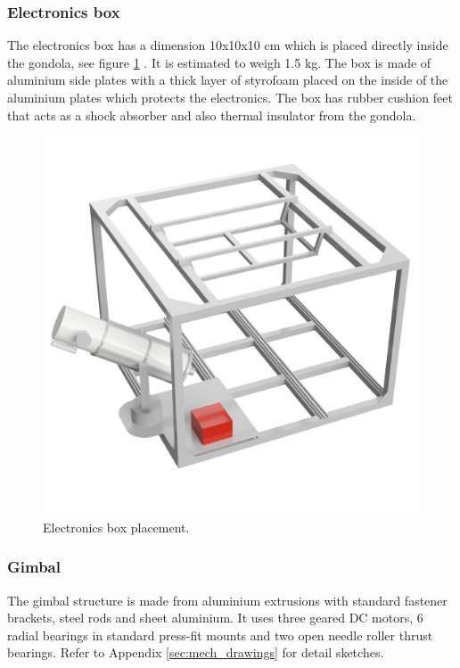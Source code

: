 \subsubsection{Electronics box}
\label{sec:4.4.2}


The electronics box has a dimension 10x10x10 cm which is placed directly inside the gondola, see figure \ref{fig::mechanical::ebox} . It is estimated to weigh 1.5 kg. The box is made of aluminium side plates with a thick layer of styrofoam placed on the inside of the aluminium plates which protects the electronics. The box has rubber cushion feet that acts as a shock absorber and also thermal insulator from the gondola.

\begin{figure}[H]
	\centering 
	\includegraphics[scale=0.4]{4-experiment-design/img/mechanical/ebox.png}
	\caption{Electronics box placement.}
	\label{fig::mechanical::ebox}
\end{figure}


\subsubsection{Gimbal}
\label {sec:4.4.3}

The gimbal structure is made from aluminium extrusions with standard fastener brackets, steel rods and sheet aluminium. It uses three geared DC motors, 6 radial bearings in standard press-fit mounts and two open needle roller thrust bearings. Refer to Appendix  \ref{sec:mech_drawings} for detail sketches.


